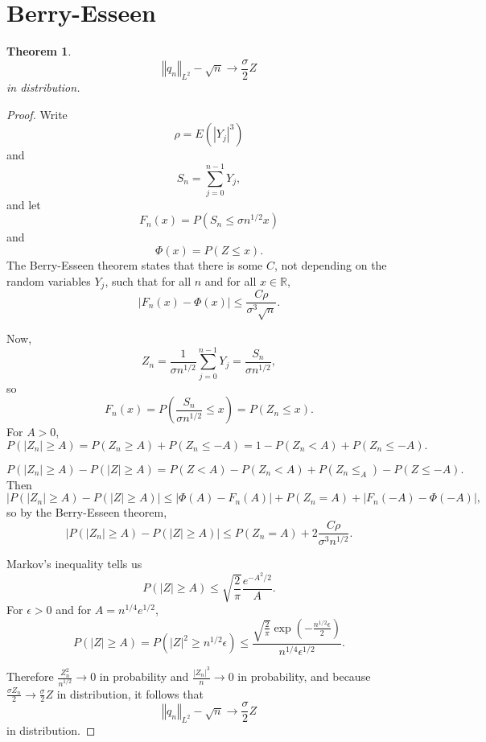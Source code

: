 \documentclass{amsart}
\newcommand{\norm}[1]{\left\Vert #1 \right\Vert}
\newtheorem{theorem}{Theorem}
\begin{document}
\section{Berry-Esseen}
\begin{theorem}
\[
\norm{q_n}_{L^2} - \sqrt{n} \to \frac{\sigma}{2} Z
\]
in distribution.
\end{theorem}
\begin{proof}
Write
\[
\rho = E(|Y_j|^3)
\]
and 
\[
S_n = \sum_{j=0}^{n-1} Y_j,
\]
and let
\[
F_n(x) = P(S_n \leq \sigma n^{1/2} x)
\]
and 
\[
\Phi(x) = P(Z \leq x).
\]
The Berry-Esseen theorem \cite[p.~262, Theorem 5.6.1]{pinsky} states that there is some $C$, not depending on the random variables
$Y_j$, such that for all $n$ and for all $x \in \mathbb{R}$,
\[
|F_n(x) - \Phi(x)| \leq \frac{C\rho}{\sigma^3 \sqrt{n}}.
\]

Now,
\[
Z_n = \frac{1}{\sigma n^{1/2}} \sum_{j=0}^{n-1} Y_j = \frac{S_n}{\sigma n^{1/2}},
\]
so
\[
F_n(x) = P\left( \frac{S_n}{\sigma n^{1/2}} \leq x\right) = P(Z_n \leq x).
\]
For $A>0$,
\[
P(|Z_n| \geq A) = P(Z_n \geq A) + P(Z_n \leq -A)
=1-P(Z_n<A)+P(Z_n \leq -A).
\]

\[
P(|Z_n| \geq A) - P(|Z| \geq A) = P(Z<A) - P(Z_n<A) + P(Z_n \leq _A) - P(Z \leq -A).
\]
Then
\[
|P(|Z_n| \geq A) - P(|Z| \geq A)|
\leq |\Phi(A)-F_n(A)| +P(Z_n = A) + |F_n(-A) - \Phi(-A)|,
\]
so by the Berry-Esseen theorem,
\[
|P(|Z_n| \geq A) - P(|Z| \geq A)| \leq P(Z_n = A) + 2\frac{C\rho}{\sigma^3 n^{1/2}}.
\]

Markov's inequality tells us
\[
P(|Z| \geq A) \leq \sqrt{\frac{2}{\pi}} \frac{e^{-A^2/2}}{A}.
\]
For $\epsilon>0$ and for $A=n^{1/4} e^{1/2}$,
\[
P(|Z| \geq A) = P(|Z|^2 \geq n^{1/2} \epsilon)
\leq \frac{\sqrt{\frac{2}{\pi}} \exp\left(-\frac{n^{1/2} \epsilon}{2} \right)}{n^{1/4} \epsilon^{1/2}}.
\]

Therefore $\frac{Z_n^2}{n^{1/2}} \to 0$ in probability and $\frac{|Z_n|^3}{n} \to 0$ in probability,
and because $\frac{\sigma Z_n}{2} \to \frac{\sigma}{2}Z$ in distribution, it follows that
\[
\norm{q_n}_{L^2} - \sqrt{n} \to \frac{\sigma}{2} Z
\]
in distribution.
\end{proof}
\end{document}
